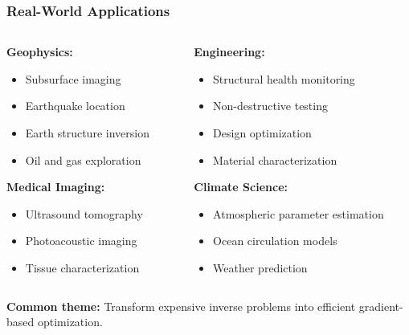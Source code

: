 \documentclass[notes]{beamer}
\begin{document}
\begin{frame}
\frametitle{Real-World Applications}

\begin{columns}[T]
    \begin{column}{0.5\textwidth}
        \textbf{Geophysics:}
        \begin{itemize}
            \item Subsurface imaging
            \item Earthquake location
            \item Earth structure inversion
            \item Oil and gas exploration
        \end{itemize}
        
        \vspace{0.5cm}
        
        \textbf{Medical Imaging:}
        \begin{itemize}
            \item Ultrasound tomography
            \item Photoacoustic imaging
            \item Tissue characterization
        \end{itemize}
    \end{column}
    \begin{column}{0.5\textwidth}
        \textbf{Engineering:}
        \begin{itemize}
            \item Structural health monitoring
            \item Non-destructive testing
            \item Design optimization
            \item Material characterization
        \end{itemize}
        
        \vspace{0.5cm}
        
        \textbf{Climate Science:}
        \begin{itemize}
            \item Atmospheric parameter estimation
            \item Ocean circulation models
            \item Weather prediction
        \end{itemize}
    \end{column}
\end{columns}

\vspace{1cm}

\textbf{Common theme:} Transform expensive inverse problems into efficient gradient-based optimization.

\end{frame}
\end{document}
